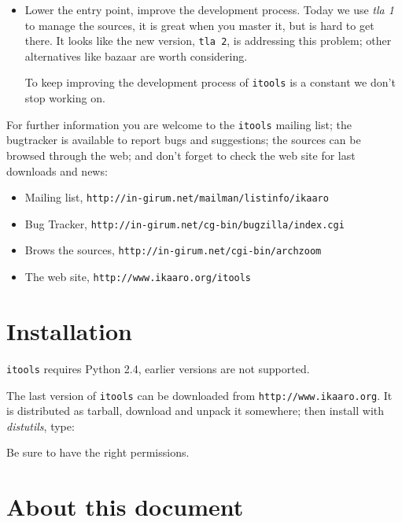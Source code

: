 \begin{itemize}
  \item Lower the entry point, improve the development process. Today we
    use {\em tla 1} to manage the sources, it is great when you master it,
    but is hard to get there. It looks like the new version, {\tt tla 2},
    is addressing this problem; other alternatives like bazaar are worth
    considering.

    To keep improving the development process of {\tt itools} is a constant
    we don't stop working on.

\end{itemize}

For further information you are welcome to the {\tt itools} mailing list;
the bugtracker is available to report bugs and suggestions; the sources
can be browsed through the web; and don't forget to check the web site
for last downloads and news:

\begin{itemize}
  \item Mailing list, {\tt http://in-girum.net/mailman/listinfo/ikaaro}
  \item Bug Tracker, {\tt http://in-girum.net/cg-bin/bugzilla/index.cgi}
  \item Brows the sources, {\tt http://in-girum.net/cgi-bin/archzoom}
  \item The web site, {\tt http://www.ikaaro.org/itools}
\end{itemize}



\section{Installation}

{\tt itools} requires Python 2.4, earlier versions are not supported.

The last version of {\tt itools} can be downloaded from
{\tt http://www.ikaaro.org}. It is distributed as tarball, download and
unpack it somewhere; then install with {\em distutils}, type:


Be sure to have the right permissions.


\section{About this document}

